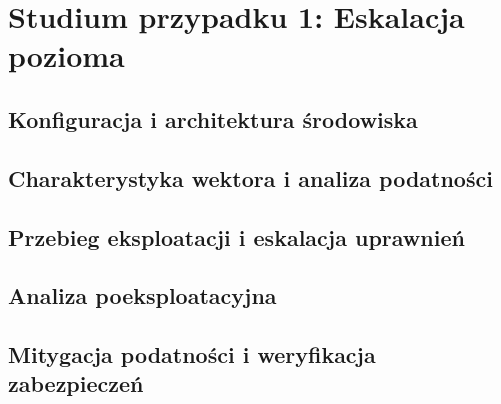 \chapter{Studium przypadku 1: Eskalacja pozioma}\label{ch:cs1-pozioma}

\section{Konfiguracja i architektura środowiska}\label{sec:cs1-srodowisko}

\section{Charakterystyka wektora i analiza podatności}\label{sec:cs1-teoria-podatnosc}

\section{Przebieg eksploatacji i eskalacja uprawnień}\label{sec:cs1-eksploatacja}

\section{Analiza poeksploatacyjna}\label{sec:cs1-analiza-poeksploatacyjna}

\section{Mitygacja podatności i weryfikacja zabezpieczeń}\label{sec:cs1-mitygacja}

